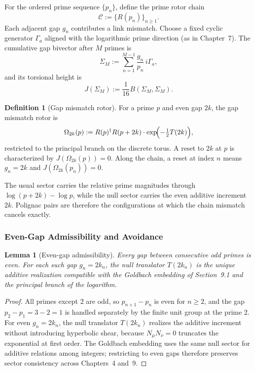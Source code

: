 \documentclass[dvipdfmx,a4paper]{article}
\newtheorem{lemma}[theorem]{Lemma}
\theoremstyle{definition}
\newtheorem{definition}[theorem]{Definition}
\theoremstyle{remark}
\begin{document}
For the ordered prime sequence \( \{p_n\} \), define the prime rotor chain
\[
\mathcal{C} := \bigl\{ R(p_n) \bigr\}_{n \geq 1}.
\]
Each adjacent gap \( g_n \) contributes a link mismatch. Choose a fixed cyclic generator \( \Gamma_a \) aligned with the logarithmic prime direction (as in Chapter~7). The cumulative gap bivector after \( M \) primes is
\[
\Sigma_M := \sum_{n=1}^{M-1} \frac{g_n}{p_n}\, i\Gamma_a,
\]
and its torsional height is
\[
J(\Sigma_M) := \frac{1}{16} B(\Sigma_M, \Sigma_M).
\]

\begin{definition}[Gap mismatch rotor]
\label{def:gap-mismatch}
For a prime \( p \) and even gap \( 2k \), the gap mismatch rotor is
\[
\Omega_{2k}(p) := R(p)^\dagger R(p + 2k) \cdot \exp\!\Bigl( -\tfrac12 T(2k) \Bigr),
\]
restricted to the principal branch on the discrete torus. A reset to \( 2k \) at \( p \) is characterized by \( J(\Omega_{2k}(p)) = 0 \). Along the chain, a reset at index \( n \) means \( g_n = 2k \) and \( J(\Omega_{2k}(p_n)) = 0 \).
\end{definition}

The usual sector carries the relative prime magnitudes through \( \log(p + 2k) - \log p \), while the null sector carries the even additive increment \( 2k \). Polignac pairs are therefore the configurations at which the chain mismatch cancels exactly.

\subsubsection{Even-Gap Admissibility and Avoidance}

\begin{lemma}[Even-gap admissibility]
\label{lem:even-gap-admissible}
Every gap between consecutive odd primes is even. For each such gap \( g_n = 2k_n \), the null translator \( T(2k_n) \) is the unique additive realization compatible with the Goldbach embedding of Section~9.1 and the principal branch of the logarithm.
\end{lemma}

\begin{proof}
All primes except 2 are odd, so \( p_{n+1} - p_n \) is even for \( n \geq 2 \), and the gap \( p_2 - p_1 = 3 - 2 = 1 \) is handled separately by the finite unit group at the prime 2. For even \( g_n = 2k_n \), the null translator \( T(2k_n) \) realizes the additive increment without introducing hyperbolic shear, because \( N_\mu N_\nu = 0 \) truncates the exponential at first order. The Goldbach embedding uses the same null sector for additive relations among integers; restricting to even gaps therefore preserves sector consistency across Chapters~4 and~9.
\end{proof}
\end{document}
